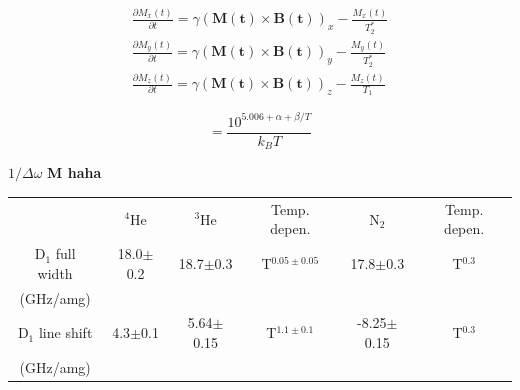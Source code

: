 \documentclass[pdftex,letterpaper,12pt]{report}
\begin{document}
	
\begin{subequations}
	\begin{gather}
	\frac{\partial M_{x}(t)}{\partial t}=\gamma\left(\boldsymbol{M(t)}\times \boldsymbol{B(t)}\right)_{x}-\frac{M_{x}(t)}{T_{2}^{*}}\\
	\frac{\partial M_{y}(t)}{\partial t}=\gamma\left(\boldsymbol{M(t)}\times \boldsymbol{B(t)}\right)_{y}-\frac{M_{y}(t)}{T_{2}^{*}}\\
	\frac{\partial M_{z}(t)}{\partial t}=\gamma\left(\boldsymbol{M(t)}\times \boldsymbol{B(t)}\right)_{z}-\frac{M_{z}(t)}{T_{1}}
	\end{gather}
\end{subequations}

\begin{equation}
[A]=\frac{10^{5.006+\alpha+\beta/T}}{k_{B}T}
\end{equation}

$1/\Delta \omega$ {\bf M haha}

\begin{center}
	\begin{tabular}{ c c c c c c}
		\hline \hline
		& $^{4}$He & $^{3}$He & Temp. depen. & N$_{2}$ & Temp. depen.\\ 
		D$_{1}$ full width & 18.0$\pm$0.2 & 18.7$\pm$0.3 & T$^{0.05\pm0.05}$ & 17.8$\pm$0.3 & T$^{0.3}$\\ 
		(GHz/amg) &&&&& \\
		D$_{1}$ line shift & 4.3$\pm$0.1 & 5.64$\pm$0.15 & T$^{1.1\pm0.1}$ &
		 -8.25$\pm$0.15 & T$^{0.3}$ \\ 
		 (GHz/amg) &&&&& \\ \hline \hline
	\end{tabular}
\end{center}
\end{document}
